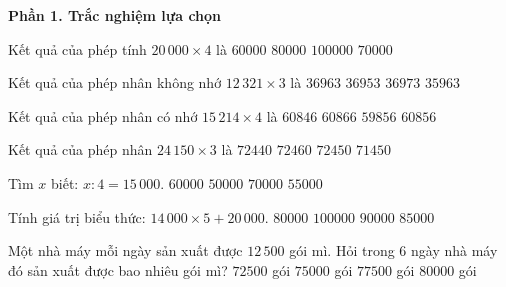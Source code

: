 \textbf{Phần 1. Trắc nghiệm lựa chọn}

\begin{ex} %
Kết quả của phép tính $20\,000 \times 4$ là
\choice
{$60000$}
{\True $80000$}
{$100000$}
{$70000$}
\end{ex}

\begin{ex} %
Kết quả của phép nhân không nhớ $12\,321 \times 3$ là
\choice
{\True $36963$}
{$36953$}
{$36973$}
{$35963$}
\end{ex}

\begin{ex} %
Kết quả của phép nhân có nhớ $15\,214 \times 4$ là
\choice
{$60846$}
{$60866$}
{$59856$}
{\True $60856$}
\end{ex}

\begin{ex} %
Kết quả của phép nhân $24\,150 \times 3$ là
\choice
{$72440$}
{$72460$}
{\True $72450$}
{$71450$}
\end{ex}

\begin{ex} %
Tìm $x$ biết: $x : 4 = 15\,000$.
\choice
{\True $60000$}
{$50000$}
{$70000$}
{$55000$}
\end{ex}

\begin{ex} %
Tính giá trị biểu thức: $14\,000 \times 5 + 20\,000$.
\choice
{$80000$}
{$100000$}
{\True $90000$}
{$85000$}
\end{ex}

\begin{ex} %
Một nhà máy mỗi ngày sản xuất được $12\,500$ gói mì. Hỏi trong 6 ngày nhà máy đó sản xuất được bao nhiêu gói mì?
\choice
{$72500$ gói}
{\True $75000$ gói}
{$77500$ gói}
{$80000$ gói}
\end{ex}

